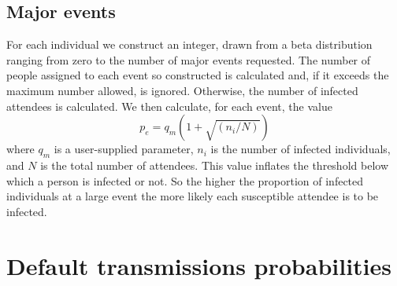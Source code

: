 \documentclass{grattan}
\begin{document}
\subsection{Major events}
For each individual we construct an integer, drawn from a beta distribution ranging from zero
to the number of major events requested. The number of people assigned to each event so constructed
is calculated and, if it exceeds the maximum number allowed, is ignored. Otherwise, the number of 
infected attendees is calculated. We then calculate, for each event, the value
\[p_e = q_m(1 + \sqrt{(n_i / N)}) \]
where \(q_m\) is a user-supplied parameter, \(n_i\) is the number of infected individuals, and \(N\)
is the total number of attendees. This value inflates the threshold below which a person is infected 
or not. So the higher the proportion of infected individuals at a large event the more likely each 
susceptible attendee is to be infected. 


\section{Default transmissions probabilities}
\end{document}
